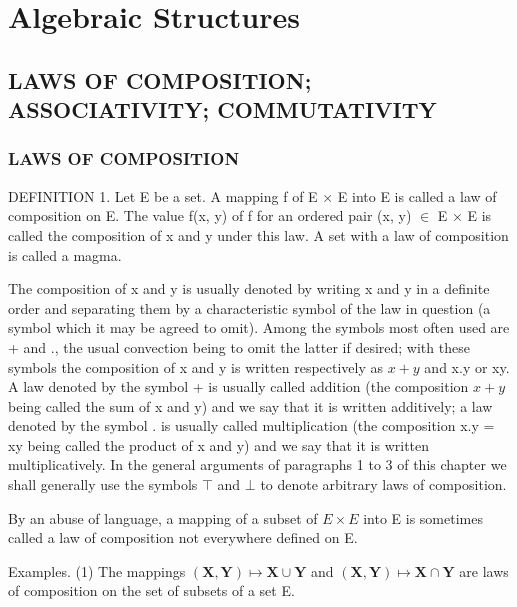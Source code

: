 \chapter{Algebraic Structures}

\section{LAWS OF COMPOSITION; ASSOCIATIVITY; COMMUTATIVITY}

\subsection{LAWS OF COMPOSITION}

DEFINITION 1. Let E be a set. A mapping f of E × E into E is called a law of composition on E. The value f(x, y) of f for an ordered pair (x, y) \ensuremath{\in} E × E is called the composition of x and y under this law. A set with a law of composition is called a magma.

The composition of x and y is usually denoted by writing x and y in a definite order and separating them by a characteristic symbol of the law in question (a symbol which it may be agreed to omit). Among the symbols most often used are + and ., the usual convection being to omit the latter if desired; with these symbols the composition of x and y is written respectively as \(x + y\) and x.y or xy. A law denoted by the symbol + is usually called addition (the composition \(x + y\) being called the sum of x and y) and we say that it is written additively; a law denoted by the symbol . is usually called multiplication (the composition x.y = xy being called the product of x and y) and we say that it is written multiplicatively. In the general arguments of paragraphs 1 to 3 of this chapter we shall generally use the symbols \(\top\) and \(\bot\) to denote arbitrary laws of composition.

By an abuse of language, a mapping of a subset of \(E \times E\) into E is sometimes called a law of composition not everywhere defined on E.

Examples. (1) The mappings \((\mathbf{X},\mathbf{Y})\mapsto \mathbf{X}\cup \mathbf{Y}\) and \((\mathbf{X},\mathbf{Y})\mapsto \mathbf{X}\cap \mathbf{Y}\) are laws of composition on the set of subsets of a set E.

